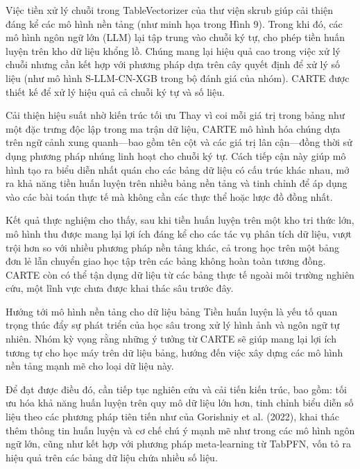 \documentclass{article}
\begin{document}
Việc tiền xử lý chuỗi trong TableVectorizer của thư viện skrub giúp cải thiện đáng kể các mô hình nền tảng (như minh họa trong Hình 9). Trong khi đó, các mô hình ngôn ngữ lớn (LLM) lại tập trung vào chuỗi ký tự, cho phép tiền huấn luyện trên kho dữ liệu khổng lồ. Chúng mang lại hiệu quả cao trong việc xử lý chuỗi nhưng cần kết hợp với phương pháp dựa trên cây quyết định để xử lý số liệu (như mô hình S-LLM-CN-XGB trong bộ đánh giá của nhóm). CARTE được thiết kế để xử lý hiệu quả cả chuỗi ký tự và số liệu.

Cải thiện hiệu suất nhờ kiến trúc tối ưu
Thay vì coi mỗi giá trị trong bảng như một đặc trưng độc lập trong ma trận dữ liệu, CARTE mô hình hóa chúng dựa trên ngữ cảnh xung quanh—bao gồm tên cột và các giá trị lân cận—đồng thời sử dụng phương pháp nhúng linh hoạt cho chuỗi ký tự. Cách tiếp cận này giúp mô hình tạo ra biểu diễn nhất quán cho các bảng dữ liệu có cấu trúc khác nhau, mở ra khả năng tiền huấn luyện trên nhiều bảng nền tảng và tinh chỉnh để áp dụng vào các bài toán thực tế mà không cần các thực thể hoặc lược đồ đồng nhất.

Kết quả thực nghiệm cho thấy, sau khi tiền huấn luyện trên một kho tri thức lớn, mô hình thu được mang lại lợi ích đáng kể cho các tác vụ phân tích dữ liệu, vượt trội hơn so với nhiều phương pháp nền tảng khác, cả trong học trên một bảng đơn lẻ lẫn chuyển giao học tập trên các bảng không hoàn toàn tương đồng. CARTE còn có thể tận dụng dữ liệu từ các bảng thực tế ngoài môi trường nghiên cứu, một lĩnh vực chưa được khai thác sâu trước đây.

Hướng tới mô hình nền tảng cho dữ liệu bảng
Tiền huấn luyện là yếu tố quan trọng thúc đẩy sự phát triển của học sâu trong xử lý hình ảnh và ngôn ngữ tự nhiên. Nhóm kỳ vọng rằng những ý tưởng từ CARTE sẽ giúp mang lại lợi ích tương tự cho học máy trên dữ liệu bảng, hướng đến việc xây dựng các mô hình nền tảng mạnh mẽ cho loại dữ liệu này.

Để đạt được điều đó, cần tiếp tục nghiên cứu và cải tiến kiến trúc, bao gồm: tối ưu hóa khả năng huấn luyện trên quy mô dữ liệu lớn hơn, tinh chỉnh biểu diễn số liệu theo các phương pháp tiên tiến như của Gorishniy et al. (2022), khai thác thêm thông tin huấn luyện và cơ chế chú ý mạnh mẽ như trong các mô hình ngôn ngữ lớn, cũng như kết hợp với phương pháp meta-learning từ TabPFN, vốn tỏ ra hiệu quả trên các bảng dữ liệu chứa nhiều số liệu.

\end{document}

